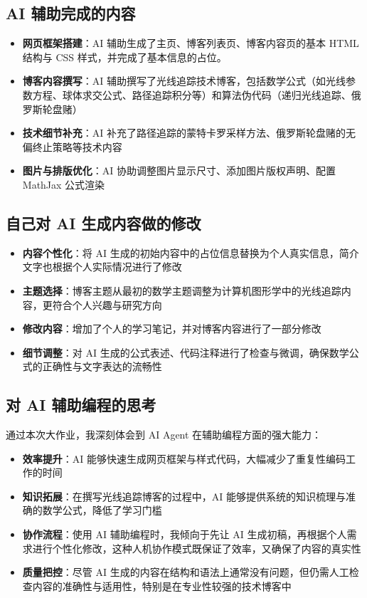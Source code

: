 \documentclass[UTF8]{article}
\begin{document}
\subsection{AI 辅助完成的内容}

\begin{itemize}
    \item \textbf{网页框架搭建}：AI 辅助生成了主页、博客列表页、博客内容页的基本 HTML 结构与 CSS 样式，并完成了基本信息的占位。
    \item \textbf{博客内容撰写}：AI 辅助撰写了光线追踪技术博客，包括数学公式（如光线参数方程、球体求交公式、路径追踪积分等）和算法伪代码（递归光线追踪、俄罗斯轮盘赌）
    \item \textbf{技术细节补充}：AI 补充了路径追踪的蒙特卡罗采样方法、俄罗斯轮盘赌的无偏终止策略等技术内容
    \item \textbf{图片与排版优化}：AI 协助调整图片显示尺寸、添加图片版权声明、配置 MathJax 公式渲染
\end{itemize}

\subsection{自己对 AI 生成内容做的修改}

\begin{itemize}
    \item \textbf{内容个性化}：将 AI 生成的初始内容中的占位信息替换为个人真实信息，简介文字也根据个人实际情况进行了修改
    \item \textbf{主题选择}：博客主题从最初的数学主题调整为计算机图形学中的光线追踪内容，更符合个人兴趣与研究方向
    \item \textbf{修改内容}：增加了个人的学习笔记，并对博客内容进行了一部分修改
    \item \textbf{细节调整}：对 AI 生成的公式表述、代码注释进行了检查与微调，确保数学公式的正确性与文字表达的流畅性
\end{itemize}

\subsection{对 AI 辅助编程的思考}

通过本次大作业，我深刻体会到 AI Agent 在辅助编程方面的强大能力：

\begin{itemize}
    \item \textbf{效率提升}：AI 能够快速生成网页框架与样式代码，大幅减少了重复性编码工作的时间
    \item \textbf{知识拓展}：在撰写光线追踪博客的过程中，AI 能够提供系统的知识梳理与准确的数学公式，降低了学习门槛
    \item \textbf{协作流程}：使用 AI 辅助编程时，我倾向于先让 AI 生成初稿，再根据个人需求进行个性化修改，这种人机协作模式既保证了效率，又确保了内容的真实性
    \item \textbf{质量把控}：尽管 AI 生成的内容在结构和语法上通常没有问题，但仍需人工检查内容的准确性与适用性，特别是在专业性较强的技术博客中
\end{itemize}
\end{document}
